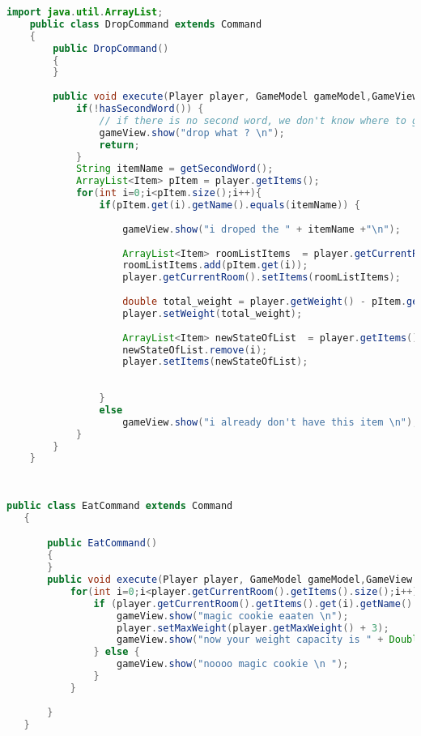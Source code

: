 \documentclass[a4paper , 10pt]{article}
\begin{document}
\begin{lstlisting}[language=Java, caption={Dropcommand}]
    import java.util.ArrayList;
    public class DropCommand extends Command
    {
        public DropCommand()
        {
        }
    
        public void execute(Player player, GameModel gameModel,GameView gameView){
            if(!hasSecondWord()) {
                // if there is no second word, we don't know where to go...
                gameView.show("drop what ? \n");
                return;
            }
            String itemName = getSecondWord();
            ArrayList<Item> pItem = player.getItems();
            for(int i=0;i<pItem.size();i++){
                if(pItem.get(i).getName().equals(itemName)) {
        
                    gameView.show("i droped the " + itemName +"\n");
        
                    ArrayList<Item> roomListItems  = player.getCurrentRoom().getItems();
                    roomListItems.add(pItem.get(i));
                    player.getCurrentRoom().setItems(roomListItems);
        
                    double total_weight = player.getWeight() - pItem.get(i).getWeight();
                    player.setWeight(total_weight);
        
                    ArrayList<Item> newStateOfList  = player.getItems();
                    newStateOfList.remove(i);
                    player.setItems(newStateOfList);
        
        
                }
                else
                    gameView.show("i already don't have this item \n");
            }
        }
    }
    
    
\end{lstlisting}
\begin{lstlisting}[language=Java, caption={Eatcommand}]
   public class EatCommand extends Command
   {

       public EatCommand()
       {
       }
       public void execute(Player player, GameModel gameModel,GameView gameView){
           for(int i=0;i<player.getCurrentRoom().getItems().size();i++) {
               if (player.getCurrentRoom().getItems().get(i).getName().equals("magic_cookie")) {
                   gameView.show("magic cookie eaaten \n");
                   player.setMaxWeight(player.getMaxWeight() + 3);
                   gameView.show("now your weight capacity is " + Double.toString(player.getMaxWeight()) + "\n");
               } else {
                   gameView.show("noooo magic cookie \n ");
               }
           }
       
       }
   }   
\end{lstlisting}
\end{document}
